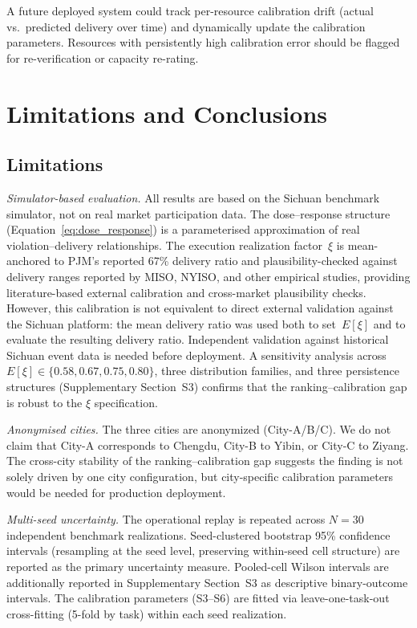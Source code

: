 \documentclass[utf8]{FrontiersinHarvard}
\begin{document}
A future deployed system could track per-resource calibration drift
(actual vs.\ predicted delivery over time) and dynamically
update the calibration parameters. Resources with persistently
high calibration error should be flagged for re-verification
or capacity re-rating.


\section{Limitations and Conclusions}
\label{sec:conclusions}

\subsection{Limitations}

\textit{Simulator-based evaluation.} All results are based on
the Sichuan benchmark simulator, not on real market
participation data. The dose--response structure
(Equation~\ref{eq:dose_response}) is a parameterised
approximation of real violation--delivery relationships.
The execution realization factor~$\xi$ is
mean-anchored to PJM's reported 67\% delivery ratio and
plausibility-checked against delivery ranges reported by
MISO, NYISO, and other empirical studies, providing
literature-based external calibration and cross-market
plausibility checks. However,
this calibration is not equivalent to direct external
validation against the Sichuan platform: the mean delivery
ratio was used both to set~$E[\xi]$ and to evaluate the
resulting delivery ratio. Independent validation against
historical Sichuan event data is needed before deployment.
A sensitivity analysis across $E[\xi] \in \{0.58, 0.67,
0.75, 0.80\}$, three distribution families, and three
persistence structures (Supplementary Section~S3) confirms
that the ranking--calibration gap is robust to the
$\xi$ specification.

\textit{Anonymised cities.} The three cities are anonymized
(City-A/B/C). We do not claim that City-A corresponds to
Chengdu, City-B to Yibin, or City-C to Ziyang. The
cross-city stability of the ranking--calibration gap suggests
the finding is not solely driven by one city configuration, but city-specific calibration
parameters would be needed for production deployment.

\textit{Multi-seed uncertainty.} The operational replay is
repeated across $N=30$ independent benchmark realizations.
Seed-clustered bootstrap 95\% confidence intervals
(resampling at the seed level, preserving within-seed cell
structure) are reported as the primary uncertainty measure.
Pooled-cell Wilson intervals are additionally reported in
Supplementary Section~S3 as descriptive binary-outcome
intervals. The calibration parameters (S3--S6) are fitted via
leave-one-task-out cross-fitting (5-fold by task) within each
seed realization.
\end{document}
